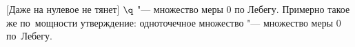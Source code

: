 [Даже на нулевое не тянет]
$\q$ "--- множество меры $0$ по Лебегу. Примерно такое же по~мощности утверждение: одноточечное множество "--- множество меры $0$ по~Лебегу.
 
